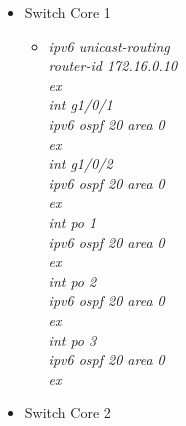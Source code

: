 \documentclass[a4paper, 12pt]{article}
\begin{document}
\begin{itemize}
\begin{itemize}
\begin{itemize}
          \end{itemize}
            \item Switch Core 1
           
        \begin{itemize}
         \item \textit{ipv6 unicast-routing\\
                       router-id 172.16.0.10\\
                        ex\\
                        int g1/0/1\\
                        ipv6 ospf 20 area 0\\
                        ex\\
                        int g1/0/2\\
                        ipv6 ospf 20 area 0\\
                        ex\\
                        int po 1\\
                        ipv6 ospf 20 area 0\\
                        ex\\
                        int po 2\\
                        ipv6 ospf 20 area 0\\
                        ex\\
                        int po 3\\
                        ipv6 ospf 20 area 0\\
                        ex\\}
        
          \end{itemize}
             \item Switch Core 2
           

\end{itemize}
\end{itemize}
\end{document}
